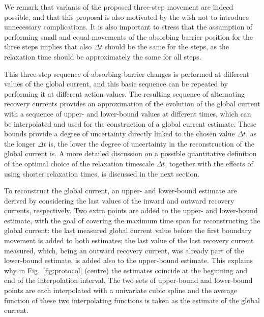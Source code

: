 We remark that variants of the proposed three-step movement are indeed possible, and that this proposal is also motivated by the wish not to introduce unnecessary complications. It is also important to stress that the assumption of performing small and equal movements of the absorbing barrier position for the three steps implies that also $\Delta t$ should be the same for the steps, as the relaxation time should be approximately the same for all steps. 

This three-step sequence of absorbing-barrier changes is performed at different values of the global current, and this basic sequence can be repeated by performing it at different action values. The resulting sequence of alternating recovery currents provides an approximation of the evolution of the global current with a sequence of upper- and lower-bound values at different times, which can be interpolated and used for the construction of a global current estimate. These bounds provide a degree of uncertainty directly linked to the chosen value $\Delta t$, as the longer $\Delta t$ is, the lower the degree of uncertainty in the reconstruction of the global current is. A more detailed discussion on a possible quantitative definition of the optimal choice of the relaxation timescale $\Delta t$, together with the effects of using shorter relaxation times, is discussed in the next section.

To reconstruct the global current, an upper- and lower-bound estimate are derived by considering the last values of the inward and outward recovery currents, respectively. Two extra points are added to the upper- and lower-bound estimate, with the goal of covering the maximum time span for reconstructing the global current: the last measured global current value before the first boundary movement is added to both estimates; the last value of the last recovery current measured, which, being an outward recovery current, was already part of the lower-bound estimate, is added also to the upper-bound estimate. This explains why in Fig.~\ref{fig:protocol} (centre) the estimates coincide at the beginning and end of the interpolation interval. The two sets of upper-bound and lower-bound points are each interpolated with a univariate cubic spline and the average function of these two interpolating functions is taken as the estimate of the global current. 

